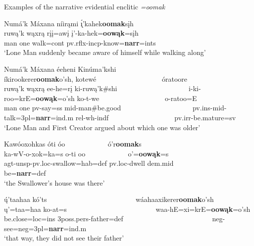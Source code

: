 \begin{exe}

\item\label{narrativeevidentialenclitic} Examples of the narrative evidential enclitic \textit{=oomak}

	\begin{xlist}

	\item\label{narrativeevidentialenclitic2}
	\glll Numá'k Máxana níirąmi \'{ı̨}'kahek\textbf{oomak}sįh\\
	ruwą'k wąxrą rįį=awį į'-ka-hek=\textbf{oowąk}=sįh\\
	\textnormal{man} \textnormal{one} \textnormal{walk}=cont pv.rflx-incp-\textnormal{know}=\textbf{narr}=ints\\
	\glt `Lone Man suddenly became aware of himself while walking along' \citep[5]{hollow1973a}
	
	\item\label{narrativeevidentialenclitic1}
	\glll Numá'k Máxana éeheni Kinúma'kshi ~ ~ ~ ~ ~ ~ ~ ~ ~ ~ ~ ~ íkirookerer\textbf{oomak}o'sh, kotewé ~ ~ ~ ~ ~ ~ ~ ~ ~ ~ ~ óratoore\\
	ruwą'k wąxrą ee-he=rį ki-ruwą'k\#shi ~ ~ ~ ~ ~ ~ ~ ~ ~ ~ ~ ~ i-ki-roo=krE=\textbf{oowąk}=o'sh ko-t-we ~ ~ ~ ~ ~ ~ ~ ~ ~ ~ ~ o-ratoo=E\\
	\textnormal{man} \textnormal{one} pv-\textnormal{say}=ss mid-\textnormal{man}\#\textnormal{be.good} ~ ~ ~ ~ ~ ~ ~ ~ ~ ~ ~ ~ pv.ins-mid-\textnormal{talk}=3pl=\textbf{narr}=ind.m rel-wh-indf ~ ~ ~ ~ ~ ~ ~ ~ ~ ~ ~ pv.irr-\textnormal{be.mature}=sv\\
	\glt `Lone Man and First Creator argued about which one was older' \citep[1]{hollow1973a}

	\item\label{narrativeevidentialenclitic3}
	\glll Kawóoxohkas óti óo ~ ~ ~ ~ ~ ~ ~  ó'r\textbf{oomak}s\\
	ka-wV-o-xok=ka=s o-ti oo ~ ~ ~ ~ ~ ~ ~ o'=\textbf{oowąk}=s\\
	agt-unsp-pv.loc-\textnormal{swallow}=hab=def   pv.loc-\textnormal{dwell} dem.mid ~ ~ ~ ~ ~ ~ ~  \textnormal{be}=\textbf{narr}=def\\
	\glt `the Swallower's house was there' \citep[170]{hollow1973a}
	
	\item\label{narrativeevidentialenclitic4}
	\glll ų́'taahaa kó'ts ~ ~ ~ ~ ~ ~ ~ ~ ~ ~ ~ ~ ~ ~ ~  wáahaaxikerer\textbf{oomak}o'sh\\
	ų'=taa=haa ko-at=s ~ ~ ~ ~ ~ ~ ~ ~ ~ ~ ~ ~ ~ ~ ~  waa-hE=xi=krE=\textbf{oowąk}=o'sh\\
	\textnormal{be.close}=loc=ins 3poss.pers-\textnormal{father}=def ~ ~ ~ ~ ~ ~ ~ ~ ~ ~ ~ ~ ~ ~ ~  neg-\textnormal{see}=neg=3pl=\textbf{narr}=ind.m\\
	\glt `that way, they did not see their father' \citep[209]{hollow1973a}

	\end{xlist}

\end{exe}

